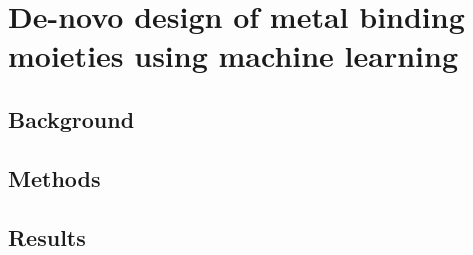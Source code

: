 \documentclass[../main/main]{subfiles}
\begin{document}
\chapter{De-novo design of metal binding moieties using machine learning}

\section{Background}

\section{Methods}

\section{Results}
\end{document}
